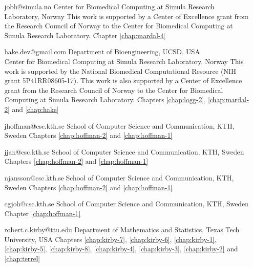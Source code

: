              {jobh@simula.no}
             {Center for Biomedical Computing at Simula Research
              Laboratory, Norway}
             {This work is supported by a Center of
              Excellence grant from the Research Council of Norway to
              the Center for Biomedical Computing at Simula Research
              Laboratory.}
             {Chapter \ref{chap:mardal-4}}

             {hake.dev@gmail.com}
             {Department of Bioengineering, UCSD, USA\\
              Center for Biomedical Computing at Simula Research
              Laboratory, Norway}
             {This work is supported by the National Biomedical
              Computational Resource (NIH grant 5P41RR08605-17).
              This work is also supported by a Center of
              Excellence grant from the Research Council of Norway to
              the Center for Biomedical Computing at Simula Research
              Laboratory.}
             {Chapters \ref{chap:logg-2}, \ref{chap:mardal-2} and \ref{chap:hake}}

             {jhoffman@csc.kth.se}
             {School of Computer Science and Communication, KTH, Sweden}
             {}
             {Chapters \ref{chap:hoffman-2} and \ref{chap:hoffman-1}}

             {jjan@csc.kth.se}
             {School of Computer Science and Communication, KTH, Sweden}
             {}
             {Chapters \ref{chap:hoffman-2} and \ref{chap:hoffman-1}}

             {njansson@csc.kth.se}
             {School of Computer Science and Communication, KTH, Sweden}
             {}
             {Chapters \ref{chap:hoffman-2} and \ref{chap:hoffman-1}}

             {cgjoh@csc.kth.se}
             {School of Computer Science and Communication, KTH, Sweden}
             {}
             {Chapter \ref{chap:hoffman-1}}

             {robert.c.kirby@ttu.edu}
             {Department of Mathematics and Statistics, Texas Tech University, USA}
             {}
             {Chapters
              \ref{chap:kirby-7},
              \ref{chap:kirby-6},
              \ref{chap:kirby-1},
              \ref{chap:kirby-5},
              \ref{chap:kirby-8},
              \ref{chap:kirby-4},
              \ref{chap:kirby-3},
              \ref{chap:kirby-2} and
              \ref{chap:terrel}}

